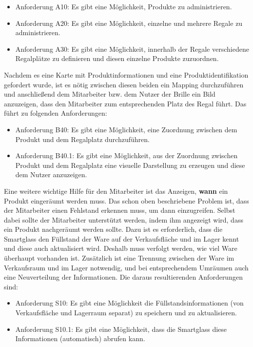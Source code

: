 \begin{itemize}
	\item Anforderung A10: Es gibt eine Möglichkeit, Produkte zu administrieren.\label{anforderung_a10}
	\item Anforderung A20: Es gibt eine Möglichkeit, einzelne und mehrere Regale zu administrieren. \label{anforderung_a20}
	\item Anforderung A30: Es gibt eine Möglichkeit, innerhalb der Regale verschiedene Regalplätze zu definieren und diesen einzelne Produkte zuzuordnen. \label{anforderung_a30}
\end{itemize}

Nachdem es eine Karte mit Produktinformationen und eine Produktidentifikation gefordert wurde, ist es nötig zwischen diesen beiden ein Mapping durchzuführen und anschließend dem Mitarbeiter bzw. dem Nutzer der Brille ein Bild anzuzeigen, dass den Mitarbeiter zum entsprechenden Platz des Regal führt. Das führt zu folgenden Anforderungen:

\begin{itemize}
	\item Anforderung B40: Es gibt eine Möglichkeit, eine Zuordnung zwischen dem Produkt und dem Regalplatz durchzuführen. \label{anforderung_b40}
	\item Anforderung B40.1: Es gibt eine Möglichkeit, aus der Zuordnung zwischen Produkt und dem Regalplatz eine visuelle Darstellung zu erzeugen und diese dem Nutzer anzuzeigen.\label{anforderung_b40_1}
\end{itemize}

Eine weitere wichtige Hilfe für den Mitarbeiter ist das Anzeigen, \textbf{wann} ein Produkt eingeräumt werden muss. Das schon oben beschriebene Problem ist, dass der Mitarbeiter einen Fehlstand erkennen muss, um dann einzugreifen. Selbst dabei sollte der Mitarbeiter unterstützt werden, indem ihm angezeigt wird,  dass ein Produkt nachgeräumt werden sollte. 
Dazu ist es erforderlich, dass die Smartglass den Füllstand der Ware auf der Verkaufsfläche und im Lager kennt und diese auch aktualisiert wird. Deshalb muss verfolgt werden, wie viel Ware überhaupt vorhanden ist. Zusätzlich ist eine Trennung zwischen der Ware im Verkaufsraum und im Lager notwendig, und bei entsprechendem Umräumen auch eine Neuverteilung der Informationen. Die daraus resultierenden Anforderungen sind: 
\begin{itemize}
	\item Anforderung S10: Es gibt eine Möglichkeit die Füllstandsinformationen (von Verkaufsfläche und Lagerraum separat) zu speichern und zu aktualisieren. \label{anforderung_s10}
	\item Anforderung S10.1: Es gibt eine Möglichkeit, dass die Smartglass diese Informationen (automatisch) abrufen kann. \label{anforderung_s10_1}
\end{itemize}

